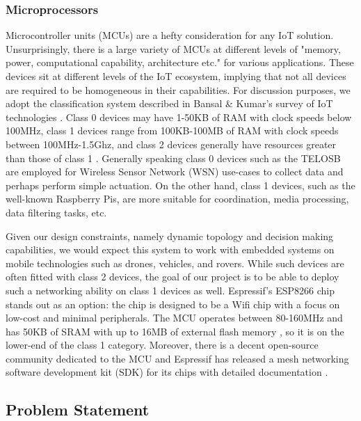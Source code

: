 \subsubsection{Microprocessors}
Microcontroller units (MCUs) are a hefty consideration for any IoT solution. Unsurprisingly, there is a large variety of MCUs at different levels of "memory, power, computational capability, architecture etc." \cite{bansal2020iotsurveydevices} for various applications. These devices sit at different levels of the IoT ecosystem, implying that not all devices are required to be homogeneous in their capabilities. For discussion purposes, we adopt the classification system described in Bansal & Kumar's survey of IoT technologies \cite{bansal2020iotsurveydevices}. Class 0 devices may have 1-50KB of RAM with clock speeds below 100MHz, class 1 devices range from 100KB-100MB of RAM with clock speeds between 100MHz-1.5Ghz, and class 2 devices generally have resources greater than those of class 1 \cite{bansal2020iotsurveydevices}. Generally speaking class 0 devices such as the TELOSB are employed for Wireless Sensor Network (WSN) use-cases to collect data and perhaps perform simple actuation. On the other hand, class 1 devices, such as the well-known Raspberry Pis, are more suitable for coordination, media processing, data filtering tasks, etc.

Given our design constraints, namely dynamic topology and decision making capabilities, we would expect this system to work with embedded systems on mobile technologies such as drones, vehicles, and rovers. While such devices are often fitted with class 2 devices, the goal of our project is to be able to deploy such a networking ability on class 1 devices as well. Espressif's ESP8266 chip stands out as an option: the chip is designed to be a Wifi chip with a focus on low-cost and minimal peripherals. The MCU operates between 80-160MHz and has 50KB of SRAM with up to 16MB of external flash memory \cite{espressif:esp8266}, so it is on the lower-end of the class 1 category. Moreover, there is a decent open-source community dedicated to the MCU and Espressif has released a mesh networking software development kit (SDK) for its chips with detailed documentation \cite{esp-mesh-docs}. 


\subsection{Problem Statement}

